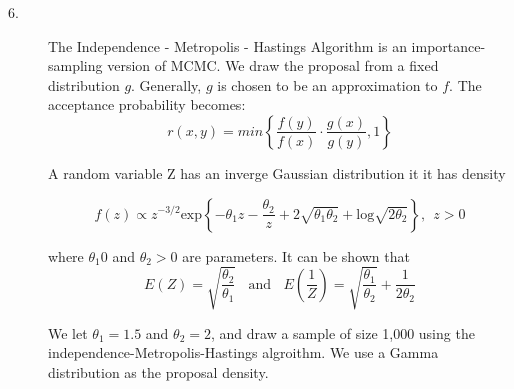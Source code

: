 \documentclass[12pt]{article}
\newcommand{\lo}{\mathrm{log}}
\begin{document}
\begin{description}
\item[6. ] The Independence - Metropolis - Hastings Algorithm is an importance-sampling version of MCMC. We draw the proposal from a fixed distribution $g$. Generally, $g$ is chosen to be an approximation to $f$. The acceptance probability becomes:
\[r(x, y) = min\left\{ \frac{f(y)}{f(x)} \cdot \frac{g(x)}{g(y)}, 1 \right\}\]

A random variable Z has an inverge Gaussian distribution it it has density

\[f(z) \propto z^{-3/2} \mathrm{exp}\left\{ -\theta_1z - \frac{\theta_2}{z} + 2\sqrt{\theta_1\theta_2} + \lo \sqrt{2\theta_2}\right\}, \ \ z >0\]

where $\theta_1 0$ and $\theta_2 >0$ are parameters. It can be shown that 
\[E(Z) = \sqrt{\frac{\theta_2}{\theta_1}} \ \ \ \ \mathrm{and} \ \ \ \ E\left(\frac{1}{Z} \right)= \sqrt{\frac{\theta_1}{\theta_2}} + \frac{1}{2\theta_2}\]

We let $\theta_1 = 1.5$ and $\theta_2 = 2$, and draw a sample of size 1,000 using the independence-Metropolis-Hastings algroithm. We use a Gamma distribution as the proposal density. 
\end{description}
\end{document}
